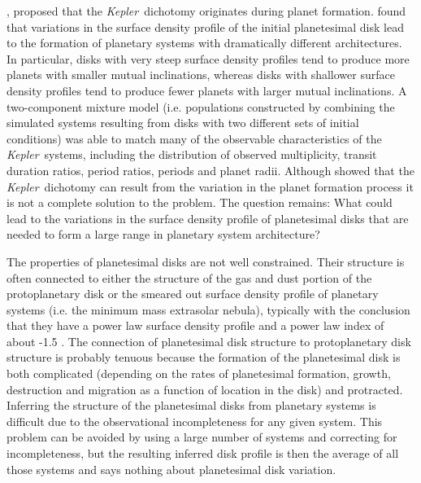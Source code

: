 \documentclass{emulateapj}
\def\kepler{{\slshape Kepler}}
\begin{document}
 \citet{Moriarty15b}, proposed that the \kepler\ dichotomy originates during planet formation. \citet{Moriarty15b} found that variations in the surface density profile of the initial planetesimal disk lead to the formation of planetary systems with dramatically different architectures. In particular, disks with very steep surface density profiles tend to produce more planets with smaller mutual inclinations, whereas disks with shallower surface density profiles tend to produce fewer planets with larger mutual inclinations. A two-component mixture model (i.e. populations constructed by combining the simulated systems resulting from disks with two different sets of initial conditions) was able to match many of the observable characteristics of the \kepler\ systems, including the distribution of observed multiplicity, transit duration ratios, period ratios, periods and planet radii. Although \citet{Moriarty15b} showed that the \kepler\ dichotomy can result from the variation in the planet formation process it is not a complete solution to the problem. The question remains: What could lead to the variations in the surface density profile of planetesimal disks that are needed to form a large range in planetary system architecture?

 The properties of planetesimal disks are not well constrained. Their structure is often connected to either the structure of the gas and dust portion of the protoplanetary disk or the smeared out surface density profile of planetary systems (i.e. the minimum mass extrasolar nebula), typically with the conclusion that they have a power law surface density profile and a power law index of about -1.5 \citep[e.g.][]{Weidenschilling77, Chiang13}. The connection of planetesimal disk structure to protoplanetary disk structure is probably tenuous because the formation of the planetesimal disk is both complicated (depending on the rates of planetesimal formation, growth, destruction and migration as a function of location in the disk) and protracted. Inferring the structure of the planetesimal disks from planetary systems is difficult due to the observational incompleteness for any given system. This problem can be avoided by using a large number of systems and correcting for incompleteness, but the resulting inferred disk profile is then the average of all those systems and says nothing about planetesimal disk variation.
\end{document}
